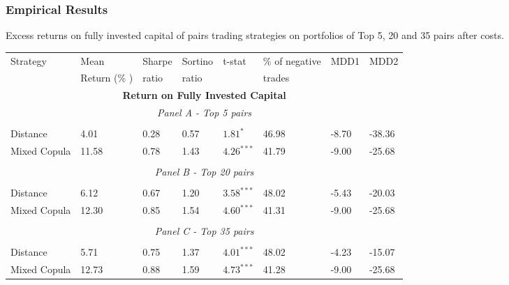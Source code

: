 \documentclass[pdf,9pt,xcolor=dvipsnames,hide notes]{beamer}
\begin{document}
\begin{frame}
	\frametitle{Empirical Results}
	\begin{threeparttable}[H]
		\centering \tiny
		\caption{Excess returns on fully invested capital of pairs trading strategies on portfolios of Top 5, 20 and 35 pairs after costs. }
		\begin{tabularx}{\textwidth}{@{\extracolsep{\fill}}llllllll@{}}
			\toprule
			Strategy & Mean  & Sharpe & Sortino & t-stat & \% of negative   & MDD1 & MDD2 \\
			& Return (\% ) & ratio &  ratio     &  &  trades     &       &  \\
			\midrule
			\multicolumn{8}{c}{\textbf{Return on Fully Invested Capital}} \\
			\multicolumn{8}{c}{\textit{Panel A - Top 5 pairs}} \\
			&       &       &       &       &       &       &  \\
			Distance & 4.01  & 0.28  & 0.57  & $1.81^{*}$  & 46.98 & -8.70    & -38.36  \\
			Mixed Copula & 11.58  & 0.78  & 1.43  & $4.26^{***}$  & 41.79 & -9.00  & -25.68 \\
			\multicolumn{1}{r}{} & \multicolumn{1}{r}{} & \multicolumn{1}{r}{} & \multicolumn{1}{r}{} & \multicolumn{1}{r}{} & \multicolumn{1}{r}{} & \multicolumn{1}{r}{} & \multicolumn{1}{r}{} \\
			\multicolumn{8}{c}{\textit{Panel B - Top 20 pairs}} \\
			&       &       &       &       &       &       &  \\
			Distance & 6.12  & 0.67  & 1.20  & $3.58^{***}$  & 48.02 & -5.43  & -20.03 \\
			Mixed Copula  & 12.30  & 0.85  & 1.54  & $4.60^{***}$  & 41.31 & -9.00  & -25.68  \\
			\multicolumn{1}{r}{} & \multicolumn{1}{r}{} & \multicolumn{1}{r}{} & \multicolumn{1}{r}{} & \multicolumn{1}{r}{} & \multicolumn{1}{r}{} & \multicolumn{1}{r}{} & \multicolumn{1}{r}{} \\
			\multicolumn{8}{c}{\textit{Panel C - Top 35 pairs}} \\
			&       &       &       &       &       &       &  \\
			Distance & 5.71  & 0.75  & 1.37  & $4.01^{***}$  & 48.02 & -4.23  & -15.07 \\
			Mixed Copula & 12.73  & 0.88  & 1.59  & $4.73^{***}$  & 41.28 & -9.00  & -25.68  \\

\end{tabularx}
\end{threeparttable}
\end{frame}
\end{document}
